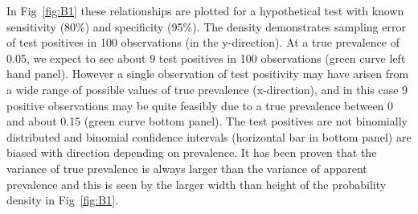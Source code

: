 \documentclass[a4paper, 12pt, twoside]{article}
\begin{document}
In Fig~\ref{fig:B1} these relationships are plotted for a hypothetical test with known sensitivity (80\%) and specificity (95\%). The density demonstrates sampling error of test positives in 100 observations (in the y-direction). At a true prevalence of 0.05, we expect to see about 9 test positives in 100 observations (green curve left hand panel). However a single observation of test positivity may have arisen from a wide range of possible values of true prevalence (x-direction), and in this case 9 positive observations may be quite feasibly due to a true prevalence between 0 and about 0.15 (green curve bottom panel). The test positives are not binomially distributed and binomial confidence intervals (horizontal bar in bottom panel) are biased with direction depending on prevalence. It has been proven that the variance of true prevalence is always larger than the variance of apparent prevalence \cite{rogan1978, lang2014} and this is seen by the larger width than height of the probability density in Fig~\ref{fig:B1}.
\end{document}
